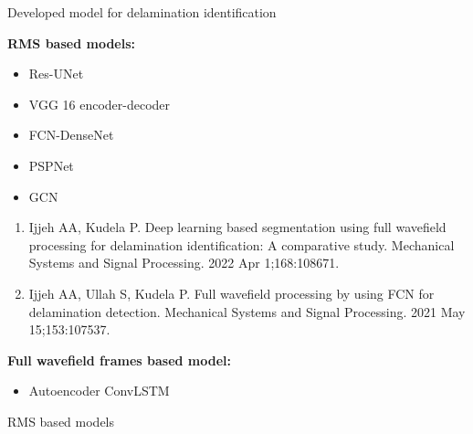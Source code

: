 \documentclass[10pt,aspectratio=169]{beamer} %
\begin{document}
\begin{frame}{Developed model for delamination identification}
	\begin{minipage}[t]{0.45\textwidth}
		\textbf{RMS based models: \\}
			\begin{itemize}
				\item Res-UNet
				\item VGG 16 encoder-decoder
				\item FCN-DenseNet
				\item PSPNet
				\item GCN
			\end{itemize}
		{\tiny  
			\begin{enumerate}
				\item Ijjeh AA, Kudela P. Deep learning based segmentation using full wavefield processing for delamination identification: A comparative study. Mechanical Systems and Signal Processing. 2022 Apr 1;168:108671.
				\item Ijjeh AA, Ullah S, Kudela P. Full wavefield processing by using FCN for delamination detection. Mechanical Systems and Signal Processing. 2021 May 15;153:107537.
				
			\end{enumerate}}	
	\end{minipage}
	\hfill
	\begin{minipage}[t]{.45\textwidth}
	\textbf{Full wavefield frames based model:}
		\begin{itemize}
			\item Autoencoder ConvLSTM
		\end{itemize}
	\end{minipage}
\end{frame}
\setcounter{subfigure}{0}
\begin{frame}{RMS based models}
	\begin{minipage}[c]{0.55\textwidth}
		\begin{figure}
		\end{figure}
	\end{minipage}
	\begin{minipage}[c]{0.35\textwidth}
		\begin{figure}
\end{figure}
	\end{minipage}

\end{frame}
\end{document}
